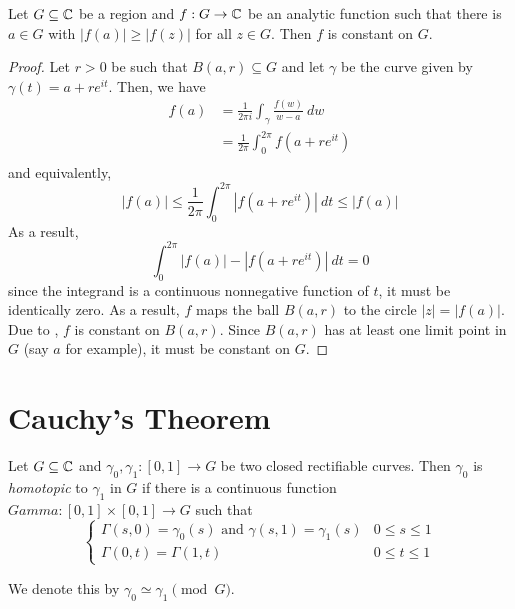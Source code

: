 \begin{theorem}
    Let $G\subseteq\mathbb{C}$ be a region and $f: G\to\mathbb{C}$ be an analytic function such that there is $a\in G$ with $|f(a)|\ge|f(z)|$ for all $z\in G$. Then $f$ is constant on $G$.
\end{theorem}
\begin{proof}
    Let $r > 0$ be such that $B(a,r)\subseteq G$ and let $\gamma$ be the curve given by $\gamma(t) = a + re^{it}$. Then, we have 
    \begin{align*}
        f(a) &= \frac{1}{2\pi i}\int_{\gamma}\frac{f(w)}{w - a}~dw\\
        &= \frac{1}{2\pi}\int_{0}^{2\pi}{f(a + re^{it})}\\
    \end{align*}
    and equivalently, 
    \begin{equation*}
        |f(a)|\le\frac{1}{2\pi}\int_{0}^{2\pi}|f(a + re^{it})|~dt\le|f(a)|
    \end{equation*}
    As a result,
    \begin{equation*}
        \int_{0}^{2\pi}|f(a)| - |f(a + re^{it})|~dt = 0
    \end{equation*}
    since the integrand is a continuous nonnegative function of $t$, it must be identically zero. As a result, $f$ maps the ball $B(a,r)$ to the circle $|z| = |f(a)|$. Due to , $f$ is constant on $B(a,r)$. Since $B(a,r)$ has at least one limit point in $G$ (say $a$ for example), it must be constant on $G$.
\end{proof}

\section{Cauchy's Theorem}

\begin{definition}
    Let $G\subseteq\mathbb{C}$ and $\gamma_0,\gamma_1: [0,1]\to G$ be two closed rectifiable curves. Then $\gamma_0$ is \textit{homotopic} to $\gamma_1$ in $G$ if there is a continuous function $Gamma:[0,1]\times[0,1]\to G$ such that 
    \begin{equation*}
        \begin{cases}
            \Gamma(s,0) = \gamma_0(s)\text{ and }\gamma(s,1) = \gamma_1(s) & 0\le s\le 1\\
            \Gamma(0,t) = \Gamma(1,t) & 0\le t\le 1
        \end{cases}
    \end{equation*}

    We denote this by $\gamma_0\simeq\gamma_1\pmod G$.
\end{definition}

